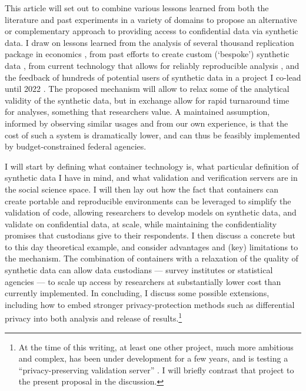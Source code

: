 \documentclass[inline]{hdsr}
\begin{document}
This article will set out to combine various lessons learned from both the literature and past experiments in a variety of domains to propose an alternative or complementary approach to providing access to confidential data via synthetic data. I draw on lessons learned from the analysis of several thousand replication package in economics \citep{vilhuber_report_2025}, from past efforts to create custom (`bespoke') synthetic data \citep{nowok_providing_2017}, from current technology that allows for reliably reproducible analysis \citep[\textbf{containers}, see ][for an introduction]{boettiger_introduction_2015}, and the feedback of hundreds of potential users of synthetic data in a project I co-lead until 2022 \citep{vilhuber_end_2022}. The proposed mechanism will allow to relax some of the analytical validity of the synthetic data, but in exchange allow for rapid turnaround time for analyses, something that researchers value. A maintained assumption, informed by observing similar usages and from our own experience, is that the cost of such a system is dramatically lower, and can thus be feasibly implemented by budget-constrained federal agencies. 


I will start by defining what container technology is, what particular definition of synthetic data I have in mind, and what validation and verification servers are in the social science space. I will then lay out how the fact that containers can create portable and reproducible environments can be leveraged to simplify the validation of code, allowing researchers to develop models on synthetic data, and validate on confidential data, at scale, while maintaining the confidentiality promises that custodians give to their respondents. I then discuss a concrete but to this day theoretical example, and consider advantages and (key) limitations to the mechanism. The combination of containers with a relaxation of the quality of synthetic data can allow data custodians --- survey institutes or statistical agencies --- to scale up access by researchers at substantially lower cost than currently implemented. In concluding, I discuss some possible extensions, including how to embed stronger privacy-protection methods such as differential privacy into both analysis and release of results.\footnote{At the time of this writing, at least one other project, much more ambitious and complex, has been under development for a few years, and is testing a ``privacy-preserving validation server'' \citep{burman2018,tyagi_privacy-preserving_2024}. I will briefly contrast that project to the present proposal in the discussion.}
\end{document}
